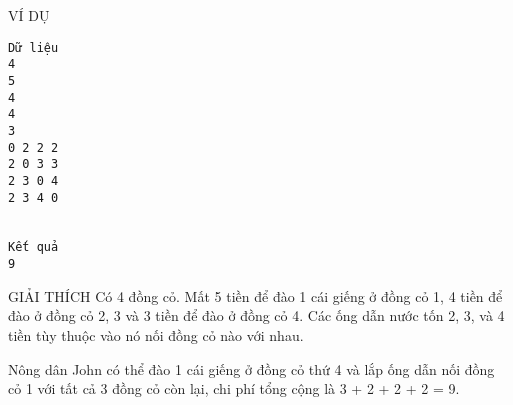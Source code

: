 VÍ DỤ  
\begin{verbatim}
Dữ liệu
4
5
4
4
3
0 2 2 2
2 0 3 3
2 3 0 4
2 3 4 0


Kết quả
9
\end{verbatim}
   GIẢI THÍCH  
Có 4 đồng cỏ. Mất 5 tiền để đào 1 cái giếng ở đồng cỏ 1, 4 tiền để đào ở đồng cỏ 2, 3 và 3 tiền để đào ở đồng cỏ 4. Các ống dẫn nước tốn 2, 3, và 4 tiền tùy thuộc vào nó nối đồng cỏ nào với nhau.  

   Nông dân John có thể đào 1 cái giếng ở đồng cỏ thứ 4 và lắp ống dẫn  nối đồng cỏ 1 với tất cả 3 đồng cỏ còn lại, chi phí tổng cộng là 3 + 2 + 2 + 2 = 9.